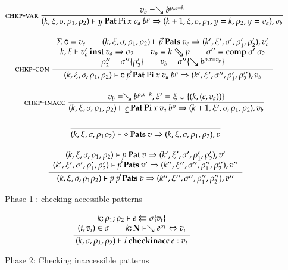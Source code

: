 \begin{figure}
\begin{gather*}
\nru{\chkpvar}
{v_b = \wh \cl{b}{\ins{\rho}{x}{k}}}
{
\checkp
{k,\xi,\sigma,\rho_1,\rho_2}
{y}
{\vpi \: x \: v_a \: \cl{b}{\rho}}
{k+1,\xi,\sigma,\ins{\rho_1}{y}{k},\ins{\rho_2}{y}{v_a}}
{v_b}}
\\[2ex]
\nxru{\chkpcon}
{\Sig \: {\cc}=v_c \qquad
\checkps{k,\xi,\sigma,\rho_1,\rho_2}
{\vec{p}}
{v_c}
{k',\xi',\sigma',\rho_1',\rho_2'}
{v'_c}
}
{\unify{k}{\xi}{v'_c}{v_a}{\sigma_2}
\qquad
v_p = \ptv{k}{p}    
\qquad
\sigma'' = \compS{\sigma'}{\sigma_2}
}
{
\rho''_2 = \substEnv{\sigma''}{\rho'_2} \qquad
v_b = \subst{\sigma''}{\wh \cl{b}{\ins{\rho}{x}{v_p}}}
}
{\checkp
{k,\xi,\sigma,\rho_1,\rho_2}
{\cc \: \vec{p}}
{\vpi \: x \: v_a \: \cl{b}{\rho}}
{k',\xi',\sigma'',\rho'_1,\rho''_2}
{v_b}
}
\\[2ex]
\nru{\chkpinacc}
{v_b = \wh \cl{b}{\ins{\rho}{x}{k}} , \xi' = \xi \cup \{ (k,(e,v_a)) \} } 
{
\checkp
{k,\xi,\sigma,\rho_1,\rho_2}
{\inacc{e}}
{\vpi \: x \: v_a \: \cl{b}{\rho}}
{k+1,\xi',\sigma,\rho_1,\rho_2}
{v_b}}
\\[2ex]
\nru{}
{}
{
\checkps
{k,\xi,\sigma,\rho_1\rho_2}
{\diamond}
{v}
{k,\xi,\sigma,\rho_1,\rho_2}
{v}}
\\[2ex]
\ndru{}
{\checkp
{k,\xi,\sigma,\rho_1,\rho_2}
{p}
{v}
{k',\xi',\sigma',\rho'_1,\rho'_2}
{v'}
}
{\checkps
{k',\xi',\sigma',\rho'_1,\rho'_2}
{\vec{p}}
{v'}
{k'',\xi'',\sigma'',\rho''_1,\rho''_2}
{v''}
}
{
\checkps
{k,\xi,\sigma,\rho_1\rho_2}
{p \: \vec{p}}
{v}
{k'',\xi'',\sigma'',\rho''_1,\rho''_2}
{v''}}
\end{gather*}
\caption{Phase 1 : checking accessible patterns}
\end{figure}

\begin{figure}
\begin{gather*}
\ \dfrac{\begin{array}[b]{c}
k;\rho_1;\rho_2\vdash e\leftleftarrows\sigma\{v_t\}
\\
(i,v_i) \in \sigma \qquad k;\mathbf{N}\vdash\searrow e^{\rho_1}\Leftrightarrow v_i
\end{array}}{
(k,\sigma,\rho_1,\rho_2)\vdash i\:\mathbf{checkinacc}\:e : v_t
}
\end{gather*}
\caption{Phase 2: Checking inaccessible patterns}
\end{figure}

